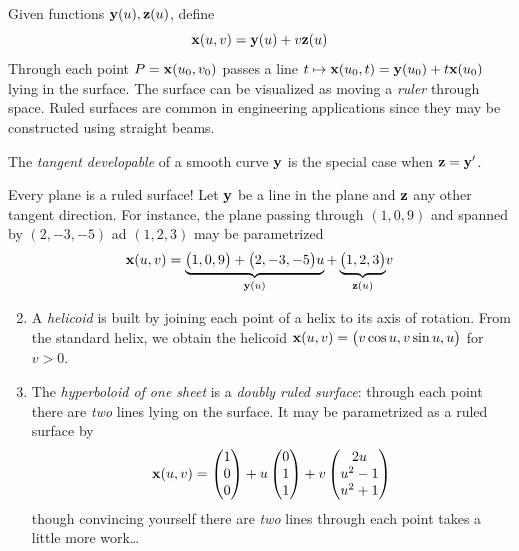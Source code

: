 \goodbreak


 Given functions ${\mathbf{y}}(u),{\mathbf{z}}(u)$, define
	\[
		{\mathbf{x}}(u,v)={\mathbf{y}}(u)+v{\mathbf{z}}(u)
	\]
	Through each point $P={\mathbf{x}}(u_0,v_0)$ passes a line $t\mapsto {\mathbf{x}}(u_0,t)={\mathbf{y}}(u_0)+t{\mathbf{x}}(u_0)$ lying in the surface. The surface can be visualized as moving a \emph{ruler} through space. Ruled surfaces are common in engineering applications since they may be constructed using straight beams.
	
\begin{defn}{}{}
	The \emph{tangent developable} of a smooth curve ${\mathbf{y}}$ is the special case when ${\mathbf{z}}={\mathbf{y}}'$.
\end{defn}

\begin{examples}{}{}
	\exstart Every plane is a ruled surface! Let ${\mathbf{y}}$ be a line in the plane and ${\mathbf{z}}$ any other tangent direction. For instance, the plane passing through $(1,0,9)$ and spanned by $(2,-3,-5)$ ad $(1,2,3)$ may be parametrized
	\[
		\vx(u,v)%
		=\underbrace{\bigl(1,0,9\bigr)+\bigl(2,-3,-5\bigr)u}_{\vy(u)}+\underbrace{\bigl(1,2,3\bigr)}_{\vz(u)}\!v
	\]
	\begin{enumerate}\setcounter{enumi}{1}
		\item A \emph{helicoid} is built by joining each point of a helix to its axis of rotation. From the standard helix, we obtain the helicoid ${\mathbf{x}}(u,v)=\bigl(v\cos u,v\sin u,u\bigr)$ for $v>0$.
	  \item\label{page:hyperrule} The \emph{hyperboloid of one sheet} is a \emph{doubly ruled surface}: through each point there are \emph{two} lines lying on the surface. It may be parametrized as a ruled surface by
		\[
			{\mathbf{x}}(u,v)=\begin{pmatrix}1\\0\\0\end{pmatrix}+u\begin{pmatrix}0\\1\\1\end{pmatrix}+v\begin{pmatrix}2u\\u^2-1\\u^2+1\end{pmatrix}
		\]
	though convincing yourself there are \emph{two} lines through each point takes a little more work\ldots
	

\end{enumerate}
\end{examples}
